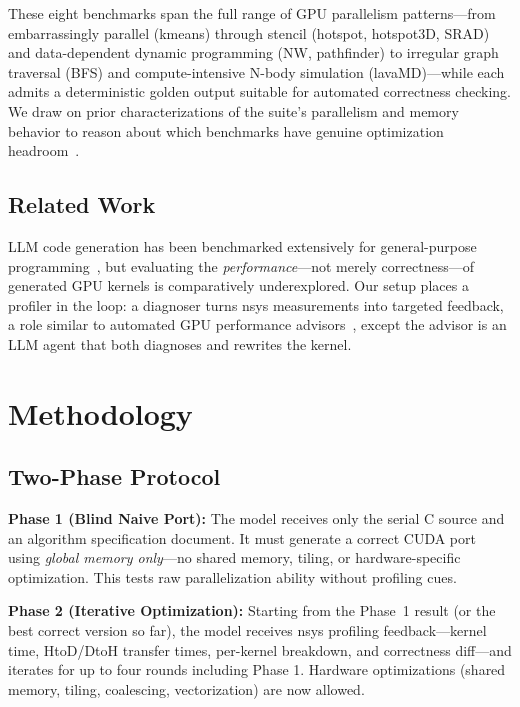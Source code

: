 \documentclass[conference]{IEEEtran}
\begin{document}
These eight benchmarks span the full range of GPU parallelism patterns---from
embarrassingly parallel (kmeans) through stencil (hotspot, hotspot3D, SRAD) and
data-dependent dynamic programming (NW, pathfinder) to irregular graph traversal
(BFS) and compute-intensive N-body simulation (lavaMD)---while each admits a
deterministic golden output suitable for automated correctness checking. We draw
on prior characterizations of the suite's parallelism and memory behavior to
reason about which benchmarks have genuine optimization headroom~\cite{che2009rodinia,rodinia2010}.

\subsection{Related Work}
LLM code generation has been benchmarked extensively for general-purpose
programming~\cite{chen2021codex}, but evaluating the \emph{performance}---not
merely correctness---of generated GPU kernels is comparatively underexplored.
Our setup places a profiler in the loop: a diagnoser turns nsys measurements
into targeted feedback, a role similar to automated GPU performance
advisors~\cite{gpa2021}, except the advisor is an LLM agent that both diagnoses
and rewrites the kernel.

\section{Methodology}
\label{sec:method}

\subsection{Two-Phase Protocol}

\textbf{Phase 1 (Blind Naive Port):} The model receives only the serial C
source and an algorithm specification document. It must generate a
correct CUDA port using \emph{global memory only}---no shared memory, tiling,
or hardware-specific optimization. This tests raw parallelization ability
without profiling cues.

\textbf{Phase 2 (Iterative Optimization):} Starting from the Phase~1 result
(or the best correct version so far), the model receives nsys profiling
feedback---kernel time, HtoD/DtoH transfer times, per-kernel breakdown, and
correctness diff---and iterates for up to four rounds including Phase 1. Hardware optimizations
(shared memory, tiling, coalescing, vectorization) are now allowed.
\end{document}
